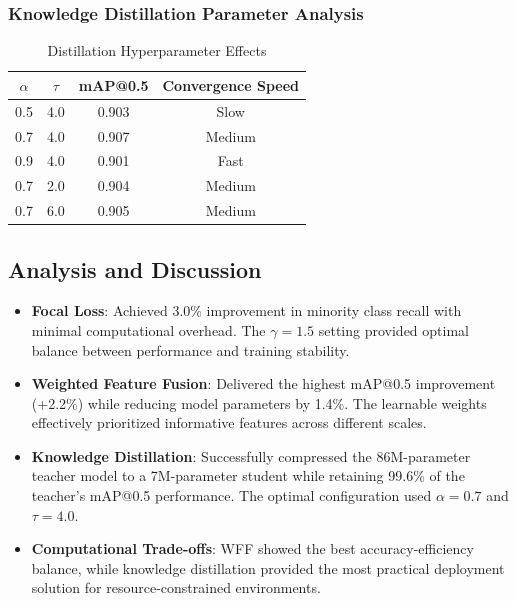 \documentclass[journal]{IEEEtran}
\begin{document}
\subsubsection{Knowledge Distillation Parameter Analysis}

\begin{table}[h]
\centering
\caption{Distillation Hyperparameter Effects}
\begin{tabular}{|c|c|c|c|}
\hline
$\alpha$ & $\tau$ & mAP@0.5 & Convergence Speed \\
\hline
0.5 & 4.0 & 0.903 & Slow \\
0.7 & 4.0 & 0.907 & Medium \\
0.9 & 4.0 & 0.901 & Fast \\
0.7 & 2.0 & 0.904 & Medium \\
0.7 & 6.0 & 0.905 & Medium \\
\hline
\end{tabular}
\end{table}

\subsection{Analysis and Discussion}

\begin{itemize}
\item \textbf{Focal Loss}: Achieved 3.0\% improvement in minority class recall with minimal computational overhead. The $\gamma = 1.5$ setting provided optimal balance between performance and training stability.

\item \textbf{Weighted Feature Fusion}: Delivered the highest mAP@0.5 improvement (+2.2\%) while reducing model parameters by 1.4\%. The learnable weights effectively prioritized informative features across different scales.

\item \textbf{Knowledge Distillation}: Successfully compressed the 86M-parameter teacher model to a 7M-parameter student while retaining 99.6\% of the teacher's mAP@0.5 performance. The optimal configuration used $\alpha = 0.7$ and $\tau = 4.0$.

\item \textbf{Computational Trade-offs}: WFF showed the best accuracy-efficiency balance, while knowledge distillation provided the most practical deployment solution for resource-constrained environments.
\end{itemize}
\end{document}
